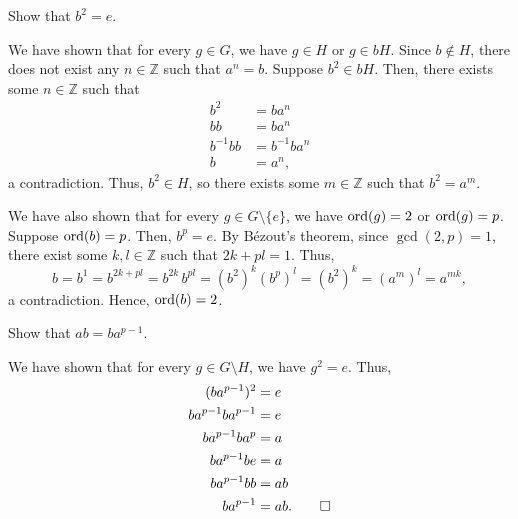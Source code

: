 \begin{exer}
Show that $ b^2=e $.
\end{exer}
\begin{sltn}
We have shown that for every $ g\in G $, we have $ g\in H $ or $ g\in bH $. Since $ b\notin H $, there does not exist any $ n\in\mathbb{Z} $ such that $ a^n=b $. Suppose $ b^2\in bH $. Then, there exists some $ n\in\mathbb{Z} $ such that
\begin{align*}
    b^2 &= ba^n \\
    bb &= ba^n \\
    b^{-1}bb &= b^{-1}ba^n \\
    b &= a^n,
\end{align*}
a contradiction. Thus, $ b^2\in H $, so there exists some $ m\in\mathbb{Z} $ such that $ b^2=a^m $.

We have also shown that for every $ g\in G\setminus\{e\} $, we have $ \operatorname{ord}(g)=2 $ or $ \operatorname{ord}(g)=p $. Suppose $ \operatorname{ord}(b)=p $. Then, $ b^p=e $. By Bézout's theorem, since $ \gcd(2,p)=1 $, there exist some $ k,l\in\mathbb{Z} $ such that $ 2k+pl=1 $. Thus,
\begin{equation*}
    b=b^1=b^{2k+pl}=b^{2k}\,b^{pl}=(b^2)^k(b^p)^l=(b^2)^k=(a^m)^l=a^{mk},
\end{equation*}
a contradiction. Hence, $ \operatorname{ord}(b)=2 $.
\end{sltn}

\begin{exer}
Show that $ ab=ba^{p-1} $.
\end{exer}
\begin{sltn}
We have shown that for every $ g\in G\setminus H $, we have $ g^2=e $. Thus,
\begin{align*}
    (ba^{p-1})^2 &= e \\
    ba^{p-1}ba^{p-1} &= e \\
    ba^{p-1}ba^p &= a \\
    ba^{p-1}be &= a \\
    ba^{p-1}bb &= ab \\
    ba^{p-1} &= ab.\qedhere
\end{align*}
\end{sltn}


